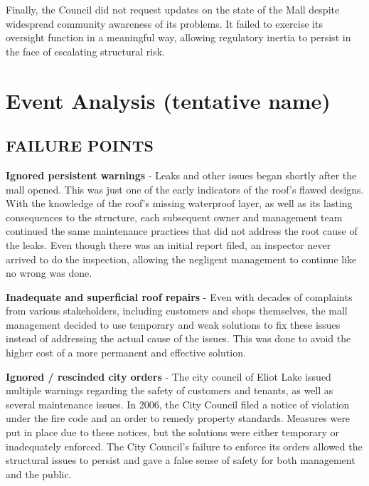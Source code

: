 \documentclass[12pt]{article}
\begin{document}
Finally, the Council did not request updates on the state of the Mall despite widespread community awareness of its problems. It failed to exercise its oversight function in a meaningful way, allowing regulatory inertia to persist in the face of escalating structural risk.

\section{Event Analysis (tentative name)} %




\subsection{FAILURE POINTS}

\textbf{Ignored persistent warnings} - Leaks and other issues began shortly after the mall opened. This was just one of the early indicators of the roof's flawed designs. With the knowledge of the roof's missing waterproof layer, as well as its lasting consequences to the structure, each subsequent owner and management team continued the same maintenance practices that did not address the root cause of the leaks. Even though there was an initial report filed, an inspector never arrived to do the inspection, allowing the negligent management to continue like no wrong was done.
 
\textbf{Inadequate and superficial roof repairs} - Even with decades of complaints from various stakeholders, including customers and shops themselves, the mall management decided to use temporary and weak solutions to fix these issues instead of addressing the actual cause of the issues. This was done to avoid the higher cost of a more permanent and effective solution.
 
\textbf{Ignored / rescinded city orders} - The city council of Eliot Lake issued multiple warnings regarding the safety of customers and tenants, as well as several maintenance issues. In 2006, the City Council filed a notice of violation under the fire code and an order to remedy property standards. Measures were put in place due to these notices, but the solutions were either temporary or inadequately enforced. The City Council's failure to enforce its orders allowed the structural issues to persist and gave a false sense of safety for both management and the public.
\end{document}
